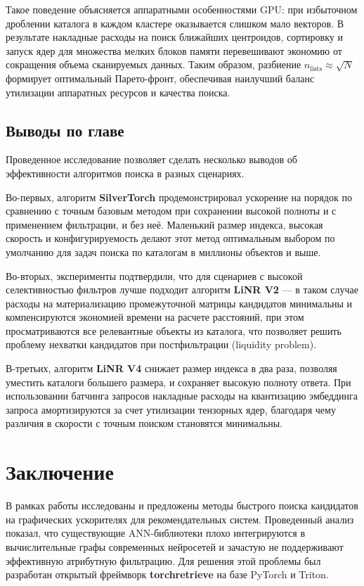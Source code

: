 \documentclass[14pt,a4paper]{extreport}
\numberwithin{figure}{chapter}
\numberwithin{table}{chapter}
\numberwithin{equation}{chapter}
\newcommand{\chapterconclusions}{
    \section{Выводы по главе}
}
\begin{document}
Такое поведение объясняется аппаратными особенностями GPU: при избыточном дроблении каталога в каждом кластере оказывается слишком мало векторов. В результате накладные расходы на поиск ближайших центроидов, сортировку и запуск ядер для множества мелких блоков памяти перевешивают экономию от сокращения объема сканируемых данных. Таким образом, разбиение $n_\mathrm{lists} \approx \sqrt{N}$ формирует оптимальный Парето-фронт, обеспечивая наилучший баланс утилизации аппаратных ресурсов и качества поиска.

\chapterconclusions

Проведенное исследование позволяет сделать несколько выводов об эффективности алгоритмов поиска в разных сценариях. 

Во-первых, алгоритм \textbf{SilverTorch} продемонстрировал ускорение на порядок по сравнению с точным базовым методом при сохранении высокой полноты и с применением фильтрации, и без неё. Маленький размер индекса, высокая скорость и конфигурируемость делают этот метод оптимальным выбором по умолчанию для задач поиска по каталогам в миллионы объектов и выше.

Во-вторых, эксперименты подтвердили, что для сценариев с высокой селективностью фильтров лучше подходит алгоритм \textbf{LiNR V2} --- в таком случае расходы на материализацию промежуточной матрицы кандидатов минимальны и компенсируются экономией времени на расчете расстояний, при этом просматриваются все релевантные объекты из каталога, что позволяет решить проблему нехватки кандидатов при постфильтрации (liquidity problem).

В-третьих, алгоритм \textbf{LiNR V4} снижает размер индекса в два раза, позволяя уместить каталоги большего размера, и сохраняет высокую полноту ответа. При использовании батчинга запросов накладные расходы на квантизацию эмбеддинга запроса амортизируются за счет утилизации тензорных ядер, благодаря чему различия в скорости с точным поиском становятся минимальны.

\chapter*{Заключение}

В рамках работы исследованы и предложены методы быстрого поиска кандидатов на графических ускорителях для рекомендательных систем. Проведенный анализ показал, что существующие ANN-библиотеки плохо интегрируются в вычислительные графы современных нейросетей и зачастую не поддерживают эффективную атрибутную фильтрацию. Для решения этой проблемы был разработан открытый фреймворк \textbf{torchretrieve} на базе PyTorch и Triton.
\end{document}
